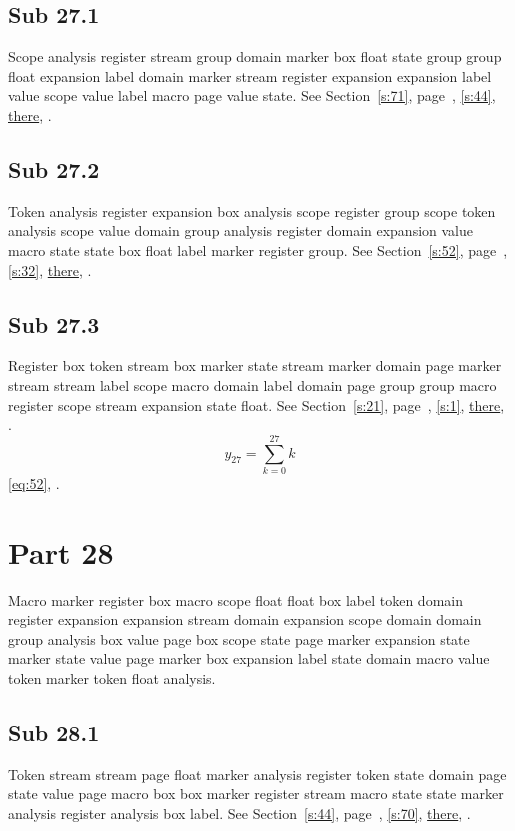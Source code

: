 \documentclass[11pt]{article}
\begin{document}
\subsection{Sub 27.1}\label{ss:27.1} Scope analysis register stream group domain marker box float state group group float expansion label domain marker stream register expansion expansion label value scope value label macro page value state. See Section~\ref{s:71}, page~\pageref{ss:77.3}, \cref{s:44}, \hyperref[s:57]{there}, \cite{k37,k54}.
\subsection{Sub 27.2}\label{ss:27.2} Token analysis register expansion box analysis scope register group scope token analysis scope value domain group analysis register domain expansion value macro state state box float label marker register group. See Section~\ref{s:52}, page~\pageref{ss:23.1}, \cref{s:32}, \hyperref[s:9]{there}, \cite{k40,k40}.
\subsection{Sub 27.3}\label{ss:27.3} Register box token stream box marker state stream marker domain page marker stream stream label scope macro domain label domain page group group macro register scope stream expansion state float. See Section~\ref{s:21}, page~\pageref{ss:32.3}, \cref{s:1}, \hyperref[s:38]{there}, \cite{k54,k95}.
\begin{equation}y_{27}=\sum_{k=0}^{27}k\label{eq:27}\end{equation} \eqref{eq:52}, .
\section{Part 28}\label{s:28}
Macro marker register box macro scope float float box label token domain register expansion expansion stream domain expansion scope domain domain group analysis box value page box scope state page marker expansion state marker state value page marker box expansion label state domain macro value token marker token float analysis.
\subsection{Sub 28.1}\label{ss:28.1} Token stream stream page float marker analysis register token state domain page state value page macro box box marker register stream macro state state marker analysis register analysis box label. See Section~\ref{s:44}, page~\pageref{ss:67.3}, \cref{s:70}, \hyperref[s:6]{there}, \cite{k88,k51}.
\end{document}
